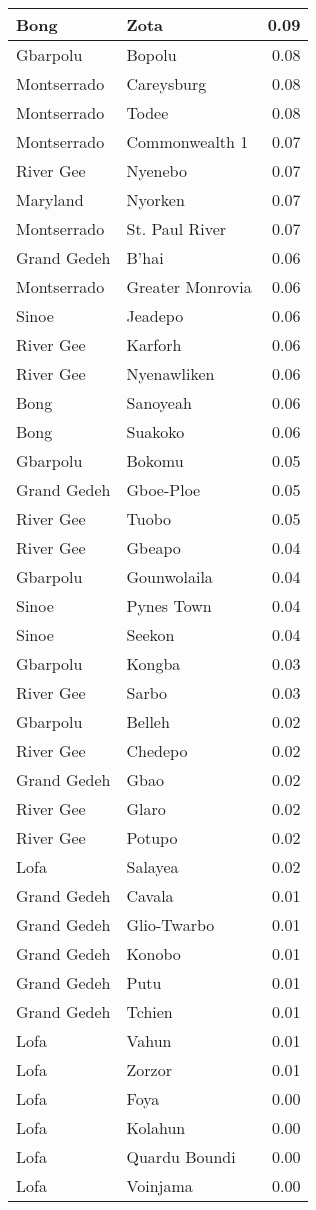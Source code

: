 \documentclass[
]{article}
\begin{document}
\begin{tabular}[t]{l|l|r}
\hline
Bong & Zota & 0.09\\
\hline
Gbarpolu & Bopolu & 0.08\\
\hline
Montserrado & Careysburg & 0.08\\
\hline
Montserrado & Todee & 0.08\\
\hline
Montserrado & Commonwealth 1 & 0.07\\
\hline
River Gee & Nyenebo & 0.07\\
\hline
Maryland & Nyorken & 0.07\\
\hline
Montserrado & St. Paul River & 0.07\\
\hline
Grand Gedeh & B'hai & 0.06\\
\hline
Montserrado & Greater Monrovia & 0.06\\
\hline
Sinoe & Jeadepo & 0.06\\
\hline
River Gee & Karforh & 0.06\\
\hline
River Gee & Nyenawliken & 0.06\\
\hline
Bong & Sanoyeah & 0.06\\
\hline
Bong & Suakoko & 0.06\\
\hline
Gbarpolu & Bokomu & 0.05\\
\hline
Grand Gedeh & Gboe-Ploe & 0.05\\
\hline
River Gee & Tuobo & 0.05\\
\hline
River Gee & Gbeapo & 0.04\\
\hline
Gbarpolu & Gounwolaila & 0.04\\
\hline
Sinoe & Pynes Town & 0.04\\
\hline
Sinoe & Seekon & 0.04\\
\hline
Gbarpolu & Kongba & 0.03\\
\hline
River Gee & Sarbo & 0.03\\
\hline
Gbarpolu & Belleh & 0.02\\
\hline
River Gee & Chedepo & 0.02\\
\hline
Grand Gedeh & Gbao & 0.02\\
\hline
River Gee & Glaro & 0.02\\
\hline
River Gee & Potupo & 0.02\\
\hline
Lofa & Salayea & 0.02\\
\hline
Grand Gedeh & Cavala & 0.01\\
\hline
Grand Gedeh & Glio-Twarbo & 0.01\\
\hline
Grand Gedeh & Konobo & 0.01\\
\hline
Grand Gedeh & Putu & 0.01\\
\hline
Grand Gedeh & Tchien & 0.01\\
\hline
Lofa & Vahun & 0.01\\
\hline
Lofa & Zorzor & 0.01\\
\hline
Lofa & Foya & 0.00\\
\hline
Lofa & Kolahun & 0.00\\
\hline
Lofa & Quardu Boundi & 0.00\\
\hline
Lofa & Voinjama & 0.00\\
\hline
\end{tabular}
\end{document}

